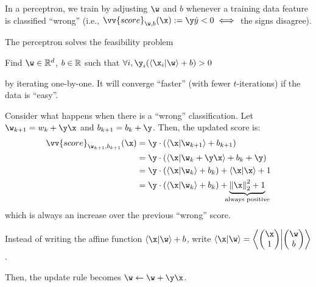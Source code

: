 \documentclass[class=cs480,notes,tikz]{agony}
\begin{document}
In a perceptron, we train by adjusting $\w$ and $b$
whenever a training data feature is classified ``wrong''
(i.e., $\vv{score}_{\w,b}(\x) := \y\hat y < 0 \iff$ the signs disagree).

The perceptron solves the feasibility problem
\begin{center}
  Find $\w \in \R^d$, $b \in \mathbb{R}$ such that $\forall i, \y_i(\ip{\x_i}{\w} + b) > 0$
\end{center}
by iterating one-by-one.
It will converge ``faster'' (with fewer $t$-iterations) if the data is ``easy''.

Consider what happens when there is a ``wrong'' classification.
Let $\w_{k+1} = w_k + \y\x$ and $b_{k+1} = b_k + \y$.
Then, the updated score is:
\begin{align*}
  \vv{score}_{\w_{k+1},b_{k+1}}(\x)
   & = \y \cdot (\ip{\x}{\w_{k+1}} + b_{k+1})                                                              \\
   & = \y \cdot (\ip{\x}{\w_k + \y\x} + b_k + \y)                                                          \\
   & = \y \cdot (\ip{\x}{\w_k} + b_k) + \ip{\x}{\x} + 1                                                    \\
   & = \y \cdot (\ip{\x}{\w_k} + b_k) + \underbrace{\norm{\x}_2^2 + 1}_{\mathclap{\text{always positive}}}
\end{align*}
which is always an increase over the previous ``wrong'' score.


Instead of writing the affine function $\ip{\x}{\w} + b$,
write $\ip{\x}{\w} = \ip{\mqty(\x\\1)}{\mqty(\w\\b)}$.

Then, the update rule becomes $\w \gets \w + \y\x$.
\end{document}

